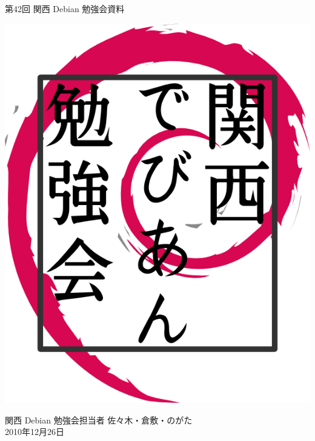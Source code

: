 \documentclass[mingoth,a4paper]{jsarticle}
\newcommand{\debmtgyear}{2010}
\newcommand{\debmtgdate}{26}
\newcommand{\debmtgmonth}{12}
\newcommand{\debmtgnumber}{42}
\begin{document}
\begin{titlepage}


 第\debmtgnumber{}回 関西 Debian 勉強会資料

\vspace{2cm}

\begin{center}
\includegraphics{image200802/kansaidebianlogo.png}
\end{center}

\begin{flushright}
\hfill{}関西 Debian 勉強会担当者 佐々木・倉敷・のがた \\
\hfill{}\debmtgyear{}年\debmtgmonth{}月\debmtgdate{}日
\end{flushright}

\thispagestyle{empty}
\end{titlepage}


\subsection*{}%
\end{document}
